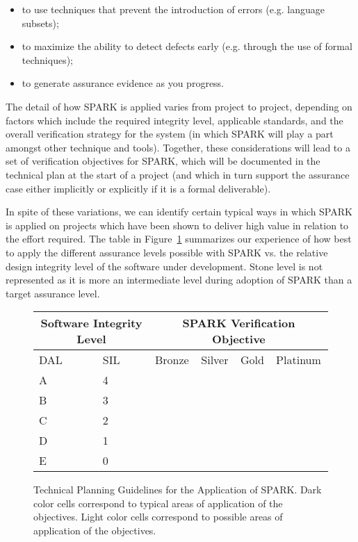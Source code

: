 \documentclass{llncs}
\begin{document}
\begin{itemize}
\item to use techniques that prevent the introduction of errors (e.g. language
  subsets);
\item to maximize the ability to detect defects early (e.g. through the use of
  formal techniques);
\item to generate assurance evidence as you progress.
\end{itemize}

The detail of how SPARK is applied varies from project to project, depending on
factors which include the required integrity level, applicable standards, and
the overall verification strategy for the system (in which SPARK will play a
part amongst other technique and tools). Together, these considerations will
lead to a set of verification objectives for SPARK, which will be documented in
the technical plan at the start of a project (and which in turn support the
assurance case either implicitly or explicitly if it is a formal deliverable).

In spite of these variations, we can identify certain typical ways in which
SPARK is applied on projects which have been shown to deliver high value in
relation to the effort required. The table in Figure~\ref{fig:levels}
summarizes our experience of how best to apply the different assurance levels
possible with SPARK vs. the relative design integrity level of the software
under development.  Stone level is not represented as it is more an
intermediate level during adoption of SPARK than a target assurance level.

\begin{figure}

\begin{center}
\begin{tabular}{|p{1.5cm}|p{1.5cm}|p{1.5cm}|p{1.5cm}|p{1.5cm}|p{1.5cm}|} \hline
\multicolumn{2}{|c|}{Software Integrity Level} & \multicolumn{4}{c|}{SPARK Verification Objective} \\  \hline
DAL & SIL & Bronze & Silver & Gold & Platinum \\ \hline
A   & 4   &        & \cellcolor{OliveGreen} & \cellcolor{OliveGreen} & \cellcolor{OliveGreen} \\ \hline
B   & 3   &        & \cellcolor{OliveGreen} & \cellcolor{OliveGreen} & \cellcolor{YellowGreen} \\ \hline
C   & 2   &        & \cellcolor{NavyBlue} & \cellcolor{NavyBlue} & \\ \hline
D   & 1   &        & \cellcolor{NavyBlue} & \cellcolor{TealBlue} & \\ \hline
E   & 0   & \cellcolor{Orchid} & \cellcolor{Fuchsia} & & \\ \hline
\end{tabular}
\end{center}

\caption{Technical Planning Guidelines for the Application of SPARK.
  Dark color cells correspond to typical areas of application of the
  objectives.  Light color cells correspond to possible areas of application of
  the objectives.}
\label{fig:levels}
\end{figure}
\end{document}
